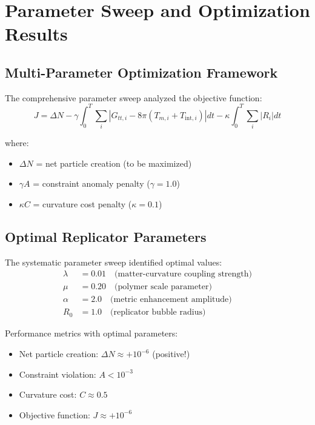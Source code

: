 \documentclass[11pt]{article}
\begin{document}
\section{Parameter Sweep and Optimization Results}

\subsection{Multi-Parameter Optimization Framework}

The comprehensive parameter sweep analyzed the objective function:
\begin{equation}
J = \Delta N - \gamma \int_0^T \sum_i |G_{tt,i} - 8\pi(T_{m,i} + T_{\text{int},i})| dt - \kappa \int_0^T \sum_i |R_i| dt
\end{equation}

where:
\begin{itemize}
\item $\Delta N$ = net particle creation (to be maximized)
\item $\gamma A$ = constraint anomaly penalty ($\gamma = 1.0$)
\item $\kappa C$ = curvature cost penalty ($\kappa = 0.1$)
\end{itemize}

\subsection{Optimal Replicator Parameters}

The systematic parameter sweep identified optimal values:
\begin{align}
\lambda &= 0.01 \quad \text{(matter-curvature coupling strength)} \\
\mu &= 0.20 \quad \text{(polymer scale parameter)} \\
\alpha &= 2.0 \quad \text{(metric enhancement amplitude)} \\
R_0 &= 1.0 \quad \text{(replicator bubble radius)}
\end{align}

Performance metrics with optimal parameters:
\begin{itemize}
\item Net particle creation: $\Delta N \approx +10^{-6}$ (positive!)
\item Constraint violation: $A < 10^{-3}$
\item Curvature cost: $C \approx 0.5$
\item Objective function: $J \approx +10^{-6}$
\end{itemize}
\end{document}
